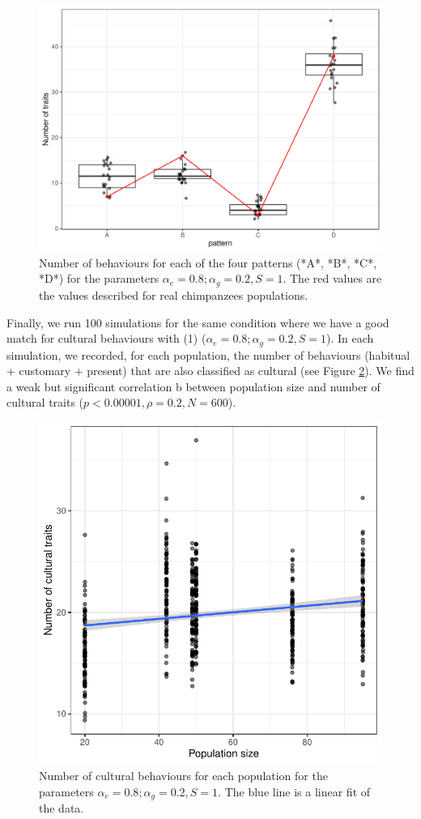\documentclass[9pt,twocolumn,twoside,]{pnas-new}
\begin{document}
\begin{figure}[h!]
\begin{center}
\includegraphics[width=11.4cm]{figures/figure_3.pdf}
\caption{Number of behaviours for each of the four patterns (*A*, *B*, *C*, *D*) for the parameters $\alpha_e=0.8;\alpha_g=0.2,S=1$. The red values are the values described for real chimpanzees populations.}
\label{Figure3}
\end{center}
\end{figure}

Finally, we run 100 simulations for the same condition where we have a
good match for cultural behaviours with (1)
(\(\alpha_e=0.8;\alpha_g=0.2, S=1\)). In each simulation, we recorded,
for each population, the number of behaviours (habitual + customary +
present) that are also classified as cultural (see Figure
\ref{Figure4}). We find a weak but significant correlation b between
population size and number of cultural traits
(\(p<0.00001,\rho=0.2,N=600\)).

\begin{figure}[h!]
\begin{center}
\includegraphics[width=11.4cm]{figures/figure_4.pdf}
\caption{Number of cultural behaviours for each population for the parameters $\alpha_e=0.8;\alpha_g=0.2,S=1$. The blue line is a linear fit of the data.}
\label{Figure4}
\end{center}
\end{figure}
\end{document}
